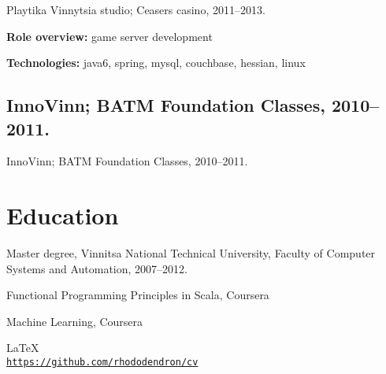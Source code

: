 \documentclass[letterpaper]{article}
\def\footerlink{https://github.com/rhododendron/cv}
\renewenvironment{itemize}{
  \begin{list}{}{
    \setlength{\leftmargin}{1.5em}
  }
}{
  \end{list}
}
\begin{document}
\begin{itemize}
\item Playtika Vinnytsia studio; Ceasers casino, 2011--2013.
\item \textbf{Role overview:} game server development
\item \textbf{Technologies:} java6, spring, mysql, couchbase, hessian, linux
\end{itemize}

\subsection*{InnoVinn; BATM Foundation Classes, 2010--2011.}

\begin{itemize}
\item InnoVinn; BATM Foundation Classes, 2010--2011.
\end{itemize}

\section*{Education}

\begin{itemize}
  \item Master degree, Vinnitsa National Technical University, Faculty of Computer 
Systems and Automation, 2007--2012.
  \item Functional Programming Principles in Scala, Coursera
  \item Machine Learning, Coursera
\end{itemize}

\bigskip

\begin{center}
  \begin{footnotesize}
    \LaTeX \\
    \href{\footerlink}{\texttt{\footerlink}}
  \end{footnotesize}
\end{center}
\end{document}
